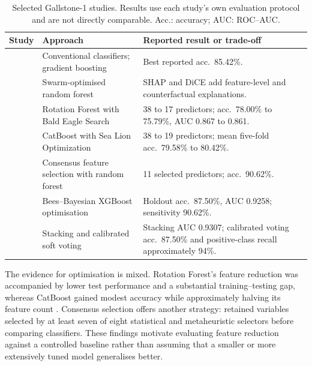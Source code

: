 \begin{table}[tbp]
\centering
\small
\caption{Selected Gallstone-1 studies. Results use each study's own evaluation protocol and are not directly comparable. Acc.: accuracy; AUC: ROC--AUC.}
\label{tab:gallstone_literature}
\setlength{\tabcolsep}{4pt}
\renewcommand{\arraystretch}{1.15}
\begin{tabularx}{\linewidth}{@{}p{2.8cm}X X@{}}
\toprule
Study & Approach & Reported result or trade-off \\
\midrule
\textcite{esen2024early} & Conventional classifiers; gradient boosting & Best reported acc.\ 85.42\%. \\
\textcite{sarker2025gallstone} & Swarm-optimised random forest & SHAP and DiCE add feature-level and counterfactual explanations. \\
\textcite{shrestha2026metaheuristic} & Rotation Forest with Bald Eagle Search & 38 to 17 predictors; acc.\ 78.00\% to 75.79\%, AUC 0.867 to 0.861. \\
\textcite{das2026sloa} & CatBoost with Sea Lion Optimization & 38 to 19 predictors; mean five-fold acc.\ 79.58\% to 80.42\%. \\
\textcite{tamer2026novel} & Consensus feature selection with random forest & 11 selected predictors; acc.\ 90.62\%. \\
\textcite{rahman2026hbb} & Bees--Bayesian XGBoost optimisation & Holdout acc.\ 87.50\%, AUC 0.9258; sensitivity 90.62\%. \\
\textcite{indirani2026ensemble} & Stacking and calibrated soft voting & Stacking AUC 0.9307; calibrated voting acc.\ 87.50\% and positive-class recall approximately 94\%. \\
\bottomrule
\end{tabularx}
\end{table}

The evidence for optimisation is mixed. Rotation Forest's feature reduction was accompanied by lower test performance and a substantial training--testing gap, whereas CatBoost gained modest accuracy while approximately halving its feature count \parencite{shrestha2026metaheuristic,das2026sloa}. Consensus selection offers another strategy: \textcite{tamer2026novel} retained variables selected by at least seven of eight statistical and metaheuristic selectors before comparing classifiers. These findings motivate evaluating feature reduction against a controlled baseline rather than assuming that a smaller or more extensively tuned model generalises better.

